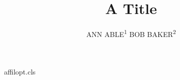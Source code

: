 \begin{filecontents*}[overwrite]{affilopt.cls}
\def\author#1{\gdef\@author{#1}}
\newcommand\affil[2][]{{\reset@font\small\unskip,\ \textsuperscript{#1}#2\endgraf}}
\def\maketitle{\par{\Large\@title\par}{\noindent\@author\par}}
\end{filecontents*}
\documentclass{affilopt}
\newcommand\sa[1]{\textsuperscript{#1}}

\title{A Title}
\author{ANN ABLE\sa{1}  BOB BAKER\sa{2} }
\maketitle
Body.

